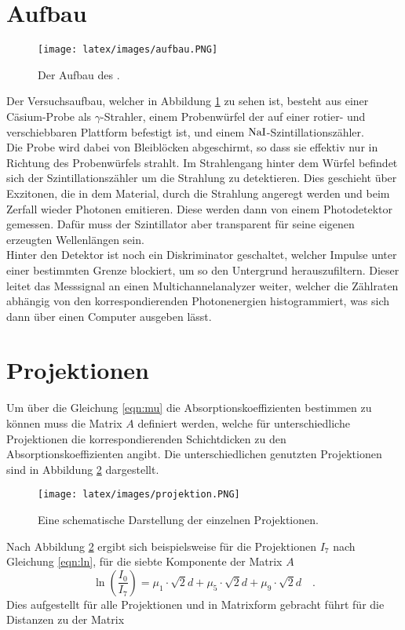 \newpage
\section{Aufbau}

\begin{figure}[H]
    \centering
    \texttt{[image: latex/images/aufbau.PNG]}
    \caption{Der Aufbau des \protect \cite{V14}.}
    \label{img:aufb}
\end{figure}

Der Versuchsaufbau, welcher in Abbildung \ref{img:aufb} zu sehen ist, besteht aus einer Cäsium-Probe als $\gamma$-Strahler, 
einem Probenwürfel der auf einer rotier- und verschiebbaren Plattform befestigt ist, und einem $\ce{NaI}$-Szintillationszähler.\\
Die Probe wird dabei von Bleiblöcken abgeschirmt, so dass sie effektiv nur in Richtung des Probenwürfels strahlt. 
Im Strahlengang hinter dem Würfel befindet sich der Szintillationszähler um die Strahlung zu detektieren. 
Dies geschieht über Exzitonen, die in dem Material, durch die Strahlung angeregt werden und beim Zerfall wieder Photonen emitieren. 
Diese werden dann von einem Photodetektor gemessen. Dafür muss der Szintillator aber transparent für seine eigenen erzeugten Wellenlängen sein.\\
Hinter den Detektor ist noch ein Diskriminator geschaltet, welcher Impulse unter einer bestimmten Grenze blockiert, um so den Untergrund herauszufiltern.
Dieser leitet das Messsignal an einen Multichannelanalyzer weiter, welcher die Zählraten abhängig von den korrespondierenden Photonenergien histogrammiert, 
was sich dann über einen Computer ausgeben lässt.

\section{Projektionen}

\noindent
Um über die Gleichung \ref{eqn:mu} die Absorptionskoeffizienten bestimmen zu können muss die Matrix $A$ definiert werden, 
welche für unterschiedliche  Projektionen die korrespondierenden Schichtdicken zu den Absorptionskoeffizienten angibt. 
Die unterschiedlichen genutzten Projektionen sind in Abbildung \ref{img:proj} dargestellt.

\begin{figure}[H]
    \centering
    \texttt{[image: latex/images/projektion.PNG]}
    \caption{Eine schematische Darstellung der einzelnen Projektionen.}
    \label{img:proj}
\end{figure}
\noindent 
Nach Abbildung \ref{img:proj} ergibt sich beispielsweise für die Projektionen $I_7$ nach Gleichung \ref{eqn:ln}, für die siebte Komponente der Matrix $A$ 
\begin{equation*}
    \ln \left(\frac{I_0}{I_7}\right) = \mu_1 \cdot \sqrt{2}d + \mu_5 \cdot \sqrt{2}d +\mu_9 \cdot \sqrt{2}d \quad .
\end{equation*} 
Dies aufgestellt für alle Projektionen und in Matrixform gebracht führt für die Distanzen zu der Matrix





